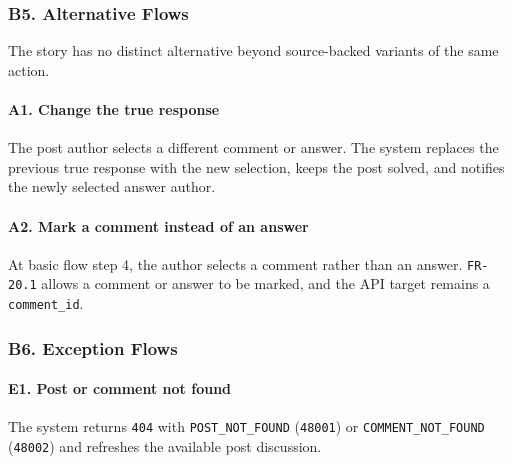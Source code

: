 \documentclass[12pt]{article}
\begin{document}
\hypertarget{sec:b5-alternative-flows}{}
\subsubsection*{B5. Alternative Flows}
\par\medskip

The story has no distinct alternative beyond source-backed variants of the same action.
\par\medskip

\hypertarget{sec:a1-change-the-true-response}{}
\paragraph*{A1. Change the true response}
\par\medskip

The post author selects a different comment or answer. The system replaces the previous true response with the new selection, keeps the post solved, and notifies the newly selected answer author.
\par\medskip

\hypertarget{sec:a2-mark-a-comment-instead-of-an-answer}{}
\paragraph*{A2. Mark a comment instead of an answer}
\par\medskip

At basic flow step 4, the author selects a comment rather than an answer. \texttt{FR-20.1} allows a comment or answer to be marked, and the API target remains a \texttt{comment\_id}.
\par\medskip

\hypertarget{sec:b6-exception-flows}{}
\subsubsection*{B6. Exception Flows}
\par\medskip

\hypertarget{sec:e1-post-or-comment-not-found}{}
\paragraph*{E1. Post or comment not found}
\par\medskip

The system returns \texttt{404} with \texttt{POST\_NOT\_FOUND} (\texttt{48001}) or \texttt{COMMENT\_NOT\_FOUND} (\texttt{48002}) and refreshes the available post discussion.
\par\medskip
\end{document}
